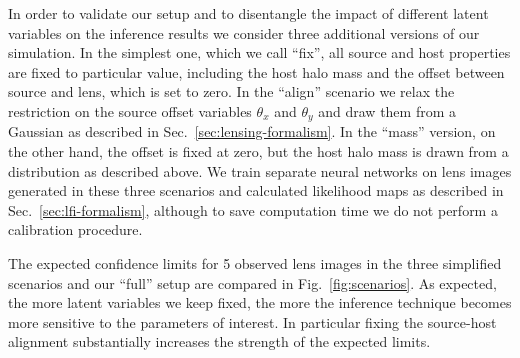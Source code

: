 \documentclass[twocolumn]{aastex62}
\begin{document}
In order to validate our setup and to disentangle the impact of different latent variables on the inference results we consider three additional versions of our simulation. In the simplest one, which we call ``fix'', all source and host properties are fixed to particular value, including the host halo mass and the offset between source and lens, which is set to zero. In the ``align'' scenario we relax the restriction on the source offset variables $\theta_x$ and $\theta_y$ and draw them from a Gaussian as described in Sec.~\ref{sec:lensing-formalism}. In the ``mass'' version, on the other hand, the offset is fixed at zero, but the host halo mass is drawn from a distribution as described above. We train separate neural networks on lens images generated in these three scenarios and calculated likelihood maps as described in Sec.~\ref{sec:lfi-formalism}, although to save computation time we do not perform a calibration procedure.

The expected confidence limits for 5 observed lens images in the three simplified scenarios and our ``full'' setup are compared in Fig.~\ref{fig:scenarios}. As expected, the more latent variables we keep fixed, the more the inference technique becomes more sensitive to the parameters of interest. In particular fixing the source-host alignment substantially increases the strength of the expected limits.




\end{document}
